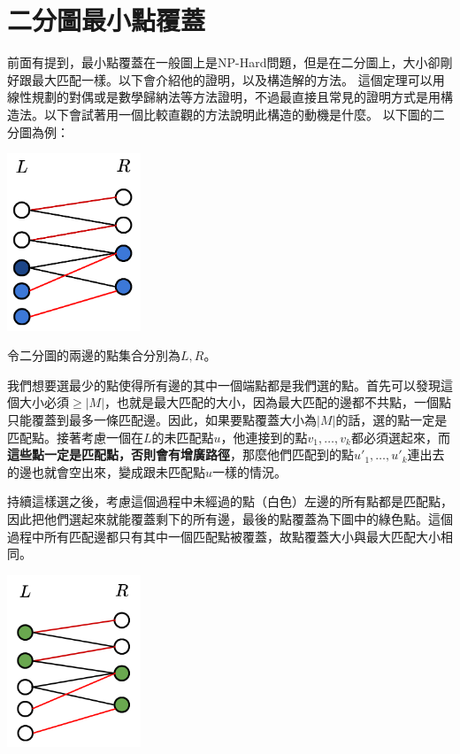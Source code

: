 \documentclass[main.tex]{subfiles}
\begin{document}
\section{二分圖最小點覆蓋}
前面有提到，最小點覆蓋在一般圖上是NP-Hard問題，但是在二分圖上，大小卻剛好跟最大匹配一樣。以下會介紹他的證明，以及構造解的方法。
這個定理可以用線性規劃的對偶或是數學歸納法等方法證明，不過最直接且常見的證明方式是用構造法。以下會試著用一個比較直觀的方法說明此構造的動機是什麼。
以下圖的二分圖為例：
\begin{center}
    \includegraphics[width=4cm]{images/Matching/VertexCover1.png}
\end{center}
令二分圖的兩邊的點集合分別為$L, R$。
\par 我們想要選最少的點使得所有邊的其中一個端點都是我們選的點。首先可以發現這個大小必須$\geq |M|$，也就是最大匹配的大小，因為最大匹配的邊都不共點，一個點只能覆蓋到最多一條匹配邊。因此，如果要點覆蓋大小為$|M|$的話，選的點一定是匹配點。接著考慮一個在$L$的未匹配點$u$，他連接到的點$v_1, \dots, v_k$都必須選起來，而\textbf{這些點一定是匹配點，否則會有增廣路徑}，那麼他們匹配到的點$u'_1, \dots, u'_k$連出去的邊也就會空出來，變成跟未匹配點$u$一樣的情況。
\par 持續這樣選之後，考慮這個過程中未經過的點（白色）左邊的所有點都是匹配點，因此把他們選起來就能覆蓋剩下的所有邊，最後的點覆蓋為下圖中的綠色點。這個過程中所有匹配邊都只有其中一個匹配點被覆蓋，故點覆蓋大小與最大匹配大小相同。
\begin{center}
    \includegraphics[width=4cm]{images/Matching/VertexCover2.png}
\end{center}
\end{document}
